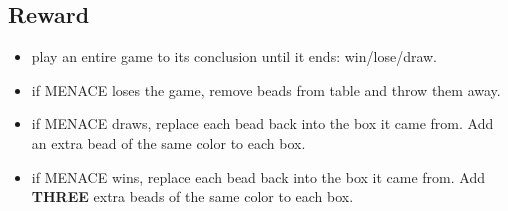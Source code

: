 \documentclass[journal, compsoc]{IEEEtran}
\begin{document}
\subsection{Reward}
\begin{itemize}
\item play an entire game to its conclusion until it ends: win/lose/draw.
\item if MENACE loses the game, remove beads from table and throw them away.
\item if MENACE draws, replace each bead back into the box it came from. Add an
 extra bead of the same color to each box.
\item if MENACE wins, replace each bead back into the box it came from. Add \textbf{THREE} extra beads of the same color to each box.
\end{itemize}
\end{document}
